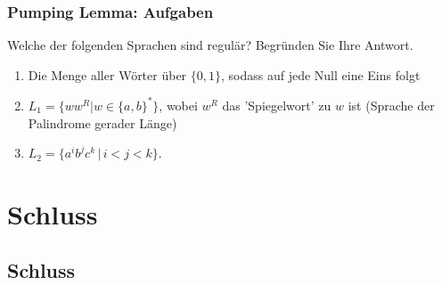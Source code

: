 \begin{frame}
\frametitle{Pumping Lemma: Aufgaben}
Welche der folgenden Sprachen sind regulär? Begründen Sie Ihre Antwort.

\begin{enumerate}
\item Die Menge aller Wörter über $\{0, 1\}$, sodass auf jede Null eine Eins folgt
\item $L_1 = \{ww^R | w \in \{a,b\}^*\}$, wobei $w^R$ das 'Spiegelwort' zu $w$ ist (Sprache der Palindrome gerader Länge)
\item $L_2 = \{a^ib^jc^k \, | \, i < j < k\}$.
\end{enumerate}

\end{frame}

\section{Schluss}
\subsection{Schluss}

